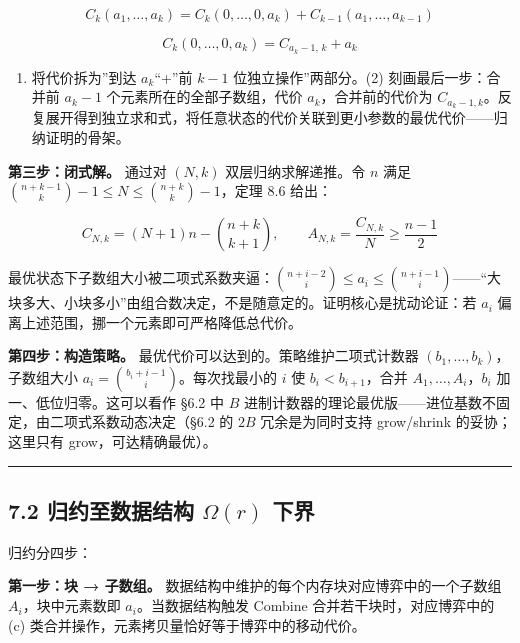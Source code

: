\documentclass[
  UTF8,
  a4paper,
  12pt]{ctexart}
\providecommand{\tightlist}{%
  \setlength{\itemsep}{0pt}\setlength{\parskip}{0pt}}
\begin{document}
\[C_k(a_1, \dots, a_k) = C_k(0, \dots, 0, a_k) + C_{k-1}(a_1, \dots, a_{k-1}) \tag{1}\]

\[C_k(0, \dots, 0, a_k) = C_{a_k-1,\, k} + a_k \tag{2}\]

\begin{enumerate}
\def\labelenumi{(\arabic{enumi})}
\tightlist
\item
  将代价拆为''到达 \(a_k\)``+''前 \(k-1\) 位独立操作''两部分。(2)
  刻画最后一步：合并前 \(a_k-1\) 个元素所在的全部子数组，代价
  \(a_k\)，合并前的代价为
  \(C_{a_k-1,k}\)。反复展开得到独立求和式，将任意状态的代价关联到更小参数的最优代价------归纳证明的骨架。
\end{enumerate}

\textbf{第三步：闭式解。} 通过对 \((N, k)\) 双层归纳求解递推。令 \(n\)
满足 \(\binom{n+k-1}{k} - 1 \le N \le \binom{n+k}{k} - 1\)，定理 8.6
给出：

\[C_{N,k} = (N+1)n - \binom{n+k}{k+1}, \qquad A_{N,k} = \frac{C_{N,k}}{N} \ge \frac{n-1}{2}\]

最优状态下子数组大小被二项式系数夹逼：\(\binom{n+i-2}{i} \le a_i \le \binom{n+i-1}{i}\)------``大块多大、小块多小''由组合数决定，不是随意定的。证明核心是扰动论证：若
\(a_i\) 偏离上述范围，挪一个元素即可严格降低总代价。

\textbf{第四步：构造策略。} 最优代价可以达到的。策略维护二项式计数器
\((b_1, \dots, b_k)\)，子数组大小
\(a_i = \binom{b_i + i - 1}{i}\)。每次找最小的 \(i\) 使
\(b_i < b_{i+1}\)，合并 \(A_1, \dots, A_i\)，\(b_i\)
加一、低位归零。这可以看作 §6.2 中 \(B\)
进制计数器的理论最优版------进位基数不固定，由二项式系数动态决定（§6.2
的 \(2B\) 冗余是为同时支持 grow/shrink 的妥协；这里只有
grow，可达精确最优）。

\begin{center}\rule{0.5\linewidth}{0.5pt}\end{center}

\subsection{\texorpdfstring{7.2 归约至数据结构 \(\Omega(r)\)
下界}{7.2 归约至数据结构 \textbackslash Omega(r) 下界}}\label{ux5f52ux7ea6ux81f3ux6570ux636eux7ed3ux6784-omegar-ux4e0bux754c}

归约分四步：

\textbf{第一步：块 → 子数组。}
数据结构中维护的每个内存块对应博弈中的一个子数组 \(A_i\)，块中元素数即
\(a_i\)。当数据结构触发 Combine 合并若干块时，对应博弈中的 (c)
类合并操作，元素拷贝量恰好等于博弈中的移动代价。
\end{document}
